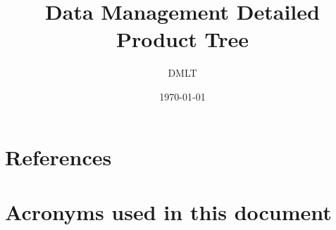 \documentclass[DM,lsstdraft,authoryear,toc]{lsstdoc}
\title{Data Management Detailed Product Tree}
\author{DMLT}
\date{\today}
\begin{document}
\providecommand{\tightlist}{%
  \setlength{\itemsep}{0pt}\setlength{\parskip}{0pt}}


\maketitle




\newpage
\appendix
\section{References} \label{sec:bib}


\section{Acronyms used in this document}\label{sec:acronyms}

\end{document}

